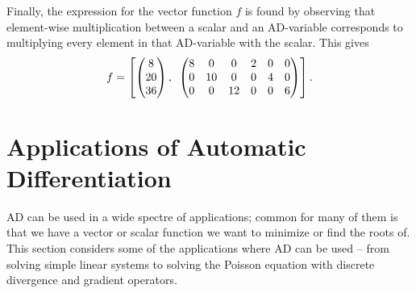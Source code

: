 Finally, the expression for the vector function $f$ is found by observing that element-wise multiplication between a scalar and an AD-variable corresponds to multiplying every element in that AD-variable with the scalar. This gives
\begin{align*}
    f = \left[
        \begin{pmatrix}
        8\\20\\36
        \end{pmatrix}
        ,\hspace{0.5em}
        \begin{pmatrix}
        8&0&0&2&0&0\\
        0&10&0&0&4&0\\
        0&0&12&0&0&6
        \end{pmatrix}
        \right].
\end{align*}
\section{Applications of Automatic Differentiation}
\label{sec:ApplicationsAD}
AD can be used in a wide spectre of applications; common for many of them is that we have a vector or scalar function we want to minimize or find the roots of. This section considers some of the applications where AD can be used -- from solving simple linear systems to solving the Poisson equation with discrete divergence and gradient operators.

